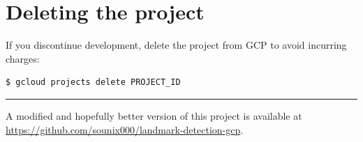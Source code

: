 \documentclass{article}
\begin{document}
\section*{Deleting the project}

If you discontinue development, delete the project from GCP to avoid incurring charges:

\begin{lstlisting}[style=bash]
$ gcloud projects delete PROJECT_ID
\end{lstlisting}

\hrule

\begin{tcolorbox}[colback=gray!5, colframe=blue!50, title=\textbf{Note}]
A modified and hopefully better version of this project is available at \url{https://github.com/sounix000/landmark-detection-gcp}.
\end{tcolorbox}
\end{document}
